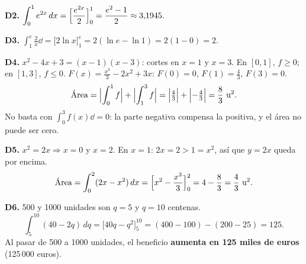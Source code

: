 \documentclass[11pt]{article}
\begin{document}
\textbf{D2.} \(\displaystyle\int_0^1e^{2x}\,dx=\Bigl[\frac{e^{2x}}{2}\Bigr]_0^1=\frac{e^2-1}{2}\approx3{,}1945.\)

\textbf{D3.} \(\displaystyle\int_1^e\frac2x\dd=\bigl[2\ln x\bigr]_1^e=2(\ln e-\ln1)=2(1-0)=2.\)

\textbf{D4.} \(x^2-4x+3=(x-1)(x-3)\): cortes en \(x=1\) y \(x=3\). En \([0,1]\), \(f\ge0\); en \([1,3]\), \(f\le0\).
\(F(x)=\frac{x^3}{3}-2x^2+3x\): \(F(0)=0\), \(F(1)=\frac43\), \(F(3)=0\).
\[\text{Área}=\Bigl|\int_0^1f\Bigr|+\Bigl|\int_1^3f\Bigr|=\Bigl|\tfrac43\Bigr|+\Bigl|-\tfrac43\Bigr|=\frac83\ \text{u}^2.\]
No basta con \(\int_0^3f(x)\dd=0\): la parte negativa compensa la positiva, y el área no puede ser cero.

\textbf{D5.} \(x^2=2x\Rightarrow x=0\) y \(x=2\). En \(x=1\): \(2x=2>1=x^2\), así que \(y=2x\) queda por encima.
\[\text{Área}=\int_0^2(2x-x^2)\dd=\Bigl[x^2-\frac{x^3}{3}\Bigr]_0^2=4-\frac83=\frac43\ \text{u}^2.\]

\textbf{D6.} 500 y 1000 unidades son \(q=5\) y \(q=10\) centenas.
\[\int_5^{10}(40-2q)\,dq=\bigl[40q-q^2\bigr]_5^{10}=(400-100)-(200-25)=125.\]
Al pasar de 500 a 1000 unidades, el beneficio \textbf{aumenta en 125 miles de euros} (125\,000 euros).
\end{document}
